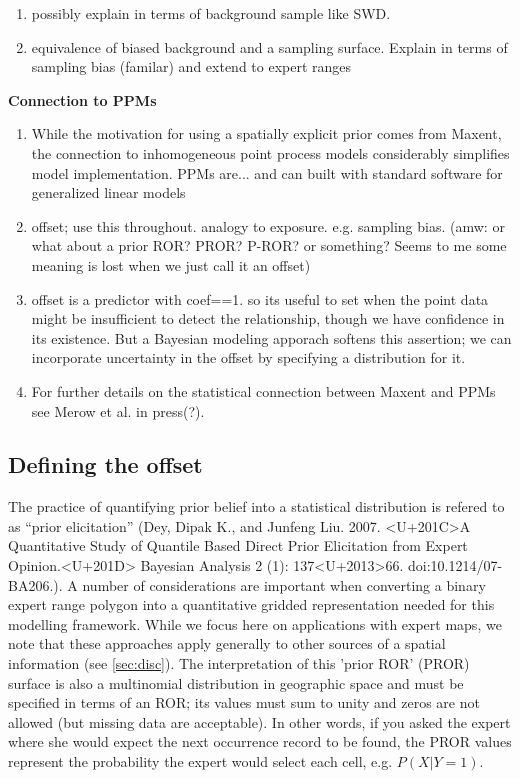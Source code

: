 \begin{enumerate}
  \item possibly explain in terms of background sample like SWD.
  \item equivalence of biased background and a sampling surface. Explain in terms of sampling bias (familar) and extend to expert ranges
\end{enumerate}


\textbf{Connection to PPMs} 

\begin{enumerate}
  \item While the motivation for using a spatially explicit prior comes from Maxent, the connection to inhomogeneous point process models \citep[PPMs; cf.][]{Warton:2010cc, Chakraborty:2011uw, Fithian:2013us, Renner:2013hf} considerably simplifies model implementation. PPMs are... and can built with standard software for generalized linear models 
  \item offset; use this throughout. analogy to exposure. e.g. sampling bias. (amw: or what about a prior ROR?   PROR? P-ROR? or something?  Seems to me some meaning is lost when we just call it an offset)
  \item offset is a predictor with coef==1. so its useful to set when the point data might be insufficient to detect the relationship, though we have confidence in its existence. But a Bayesian modeling apporach softens this assertion; we can incorporate uncertainty in the offset by specifying a distribution for it. 
  \item For further details on the statistical connection between Maxent and PPMs see Merow et al. in press(?).
\end{enumerate}


\subsection{Defining the offset}
\label{smooth} 

The practice of quantifying prior belief into a statistical distribution is refered to as ``prior elicitation'' (Dey, Dipak K., and Junfeng Liu. 2007. <U+201C>A Quantitative Study of Quantile Based Direct Prior Elicitation from Expert Opinion.<U+201D> Bayesian Analysis 2 (1): 137<U+2013>66. doi:10.1214/07-BA206.).  A number of considerations are important when converting a binary expert range polygon into a quantitative gridded representation needed for this modelling framework.  While we focus here on applications with expert maps, we note that these approaches apply generally to other sources of a spatial information (see \ref{sec:disc}). 
The interpretation of this 'prior ROR' (PROR) surface is also a multinomial distribution in geographic space and must be specified in terms of an ROR; its values must sum to unity and zeros are not allowed (but missing data are acceptable).  In other words, if you asked the expert where she would expect the next occurrence record to be found,  the PROR values represent the probability the expert would select each cell, e.g. $P(X|Y=1)$.


